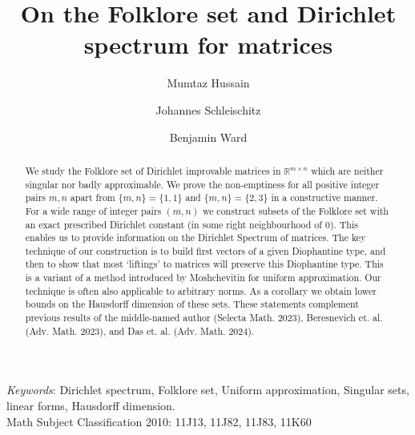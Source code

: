 \documentclass[10pt]{amsart}
\theoremstyle{definition}
\newcommand{\R}{\mathbb{R}}
\begin{document}
	

\title[On the Folklore set and Dirichlet spectrum for matrices]{On the Folklore set and Dirichlet spectrum for matrices}

\author[Mumtaz Hussain]{Mumtaz Hussain}
\address{Mumtaz Hussain,  Department of Mathematical and Physical Sciences,  La Trobe University, Bendigo 3552, Australia. }

\author[Johannes Schleischitz]{Johannes Schleischitz}
\address{Johannes Schleischitz, Middle East Technical University, Northern Cyprus Campus, Kalkanli, G\"uzelyurt.}


\author[Benjamin Ward]{Benjamin Ward}
\address{Benjamin Ward,  University of York, Heslington, York, YO10 5DD, United Kingdom.}


\begin{abstract}
We study the Folklore set of Dirichlet improvable matrices in $\R^{m\times n}$ which are neither singular nor badly approximable. We prove the non-emptiness for all positive integer pairs $m,n$ apart from $\{m,n\}=\{ 1,1\}$ and $\{m,n\}=\{ 2,3\}$ in a constructive manner.  For a wide range of integer pairs $(m,n)$ we construct subsets of the Folklore set with an exact prescribed Dirichlet constant (in some right neighbourhood of $0$). This enables us to provide information on the Dirichlet Spectrum of matrices. The key technique of our construction is to build  first vectors of a given Diophantine type, and then 
to show that most `liftings' to matrices will preserve this Diophantine type. 
This is a variant of a method 
introduced by Moshchevitin for uniform approximation.
Our technique is often also applicable to arbitrary norms. As a corollary we obtain lower bounds on the Hausdorff dimension of these sets. These statements complement previous results of the middle-named author (Selecta Math. 2023), Beresnevich et. al. (Adv. Math. 2023), and Das et. al. (Adv. Math. 2024).


\end{abstract}

\maketitle

{\footnotesize{


{\em Keywords}: Dirichlet spectrum, Folklore set, Uniform approximation, Singular sets, linear forms, Hausdorff dimension.  \\
Math Subject Classification 2010: 11J13, 11J82, 11J83, 11K60}}
\end{document}
